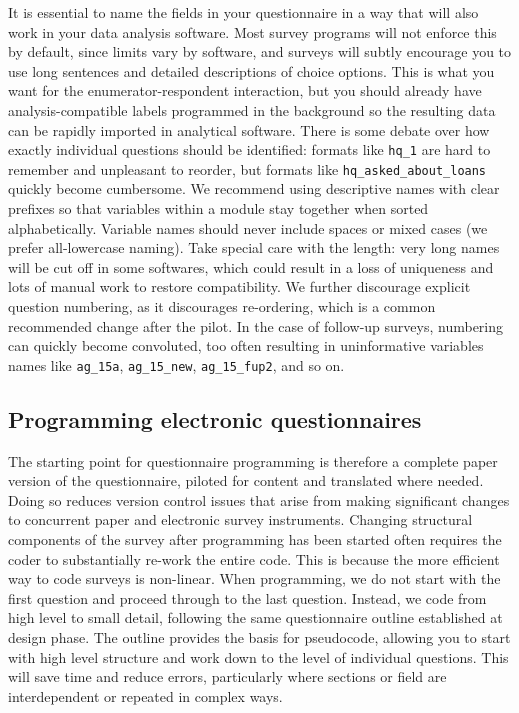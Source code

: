 It is essential to name the fields in your questionnaire
in a way that will also work in your data analysis software.
Most survey programs will not enforce this by default,
since limits vary by software,
and surveys will subtly encourage you to use long sentences
and detailed descriptions of choice options.
This is what you want for the enumerator-respondent interaction,
but you should already have analysis-compatible labels programmed in the background
so the resulting data can be rapidly imported in analytical software.
There is some debate over how exactly individual questions should be identified:
formats like \texttt{hq\_1} are hard to remember and unpleasant to reorder,
but formats like \texttt{hq\_asked\_about\_loans} quickly become cumbersome.
We recommend using descriptive names with clear prefixes so that variables
within a module stay together when sorted alphabetically.
Variable names should never include spaces or mixed cases
(we prefer all-lowercase naming).
Take special care with the length: very long names will be cut off in some softwares,
which could result in a loss of uniqueness and lots of manual work to restore compatibility.
We further discourage explicit question numbering, as it discourages re-ordering,
which is a common recommended change after the pilot.
In the case of follow-up surveys, numbering can quickly become convoluted,
too often resulting in uninformative variables names like
\texttt{ag\_15a}, \texttt{ag\_15\_new}, \texttt{ag\_15\_fup2}, and so on.

\subsection{Programming electronic questionnaires}

The starting point for questionnaire programming is therefore a complete paper version of the questionnaire,
piloted for content and translated where needed.
Doing so reduces version control issues that arise from making significant changes
to concurrent paper and electronic survey instruments.
Changing structural components of the survey after programming has been started
often requires the coder to substantially re-work the entire code.
This is because the more efficient way to code surveys is non-linear.
When programming, we do not start with the first question and proceed through to the last question.
Instead, we code from high level to small detail,
following the same questionnaire outline established at design phase.
The outline provides the basis for pseudocode,
allowing you to start with high level structure and work down to the level of individual questions.
This will save time and reduce errors,
particularly where sections or field are interdependent or repeated in complex ways.


